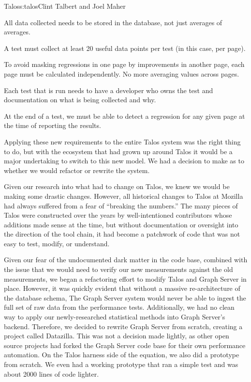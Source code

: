 \begin{aosachapter}{Talos}{s:talos}{Clint Talbert and Joel Maher}
\begin{aosaitemize}

\item
  All data collected needs to be stored in the database, not just
  averages of averages.
\item
  A test must collect at least 20 useful data points per test (in this
  case, per page).
\item
  To avoid masking regressions in one page by improvements in another
  page, each page must be calculated independently. No more averaging
  values across pages.
\item
  Each test that is run needs to have a developer who owns the test and
  documentation on what is being collected and why.
\item
  At the end of a test, we must be able to detect a regression for any
  given page at the time of reporting the results.
\end{aosaitemize}

Applying these new requirements to the entire Talos system was the right
thing to do, but with the ecosystem that had grown up around Talos it
would be a major undertaking to switch to this new model. We had a
decision to make as to whether we would refactor or rewrite the system.


Given our research into what had to change on Talos, we knew we would be
making some drastic changes. However, all historical changes to Talos at
Mozilla had always suffered from a fear of ``breaking the numbers.'' The
many pieces of Talos were constructed over the years by well-intentioned
contributors whose additions made sense at the time, but without
documentation or oversight into the direction of the tool chain, it had
become a patchwork of code that was not easy to test, modify, or
understand.

Given our fear of the undocumented dark matter in the code base,
combined with the issue that we would need to verify our new
measurements against the old measurements, we began a refactoring effort
to modify Talos and Graph Server in place. However, it was quickly
evident that without a massive re-architecture of the database schema,
The Graph Server system would never be able to ingest the full set of
raw data from the performance tests. Additionally, we had no clean way
to apply our newly-researched statistical methods into Graph Server's
backend. Therefore, we decided to rewrite Graph Server from scratch,
creating a project called Datazilla. This was not a decision made
lightly, as other open source projects had forked the Graph Server code
base for their own performance automation. On the Talos harness side of
the equation, we also did a prototype from scratch. We even had a
working prototype that ran a simple test and was about 2000 lines of
code lighter.


\end{aosachapter}
